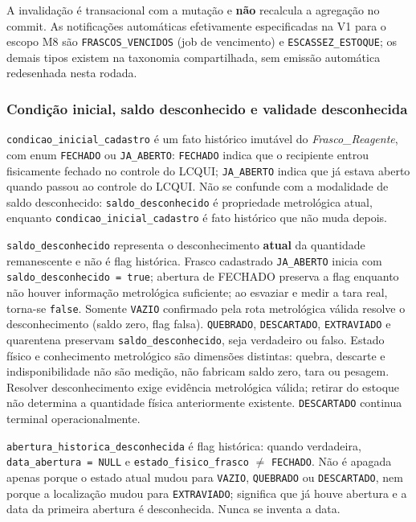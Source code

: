 A invalidação é transacional com a mutação e \textbf{não} recalcula a agregação no commit. As notificações automáticas efetivamente especificadas na V1 para o escopo M8 são \texttt{FRASCOS\_VENCIDOS} (job de vencimento) e \texttt{ESCASSEZ\_ESTOQUE}; os demais tipos existem na taxonomia compartilhada, sem emissão automática redesenhada nesta rodada.

\subsubsection{Condição inicial, saldo desconhecido e validade desconhecida}
\begin{regra}
\texttt{condicao\_inicial\_cadastro} é um fato histórico imutável do \textit{Frasco\_Reagente}, com enum \texttt{FECHADO} ou \texttt{JA\_ABERTO}: \texttt{FECHADO} indica que o recipiente entrou fisicamente fechado no controle do LCQUI; \texttt{JA\_ABERTO} indica que já estava aberto quando passou ao controle do LCQUI. Não se confunde com a modalidade de saldo desconhecido: \texttt{saldo\_desconhecido} é propriedade metrológica atual, enquanto \texttt{condicao\_inicial\_cadastro} é fato histórico que não muda depois.

\texttt{saldo\_desconhecido} representa o desconhecimento \textbf{atual} da quantidade remanescente e não é flag histórica. Frasco cadastrado \texttt{JA\_ABERTO} inicia com \texttt{saldo\_desconhecido = true}; abertura de FECHADO preserva a flag enquanto não houver informação metrológica suficiente; ao esvaziar e medir a tara real, torna-se \texttt{false}. Somente \texttt{VAZIO} confirmado pela rota metrológica válida resolve o desconhecimento (saldo zero, flag falsa). \texttt{QUEBRADO}, \texttt{DESCARTADO}, \texttt{EXTRAVIADO} e quarentena preservam \texttt{saldo\_desconhecido}, seja verdadeiro ou falso. Estado físico e conhecimento metrológico são dimensões distintas: quebra, descarte e indisponibilidade não são medição, não fabricam saldo zero, tara ou pesagem. Resolver desconhecimento exige evidência metrológica válida; retirar do estoque não determina a quantidade física anteriormente existente. \texttt{DESCARTADO} continua terminal operacionalmente.

\texttt{abertura\_historica\_desconhecida} é flag histórica: quando verdadeira, \texttt{data\_abertura = NULL} e \texttt{estado\_fisico\_frasco} $\neq$ \texttt{FECHADO}. Não é apagada apenas porque o estado atual mudou para \texttt{VAZIO}, \texttt{QUEBRADO} ou \texttt{DESCARTADO}, nem porque a localização mudou para \texttt{EXTRAVIADO}; significa que já houve abertura e a data da primeira abertura é desconhecida. Nunca se inventa a data.


\end{regra}
